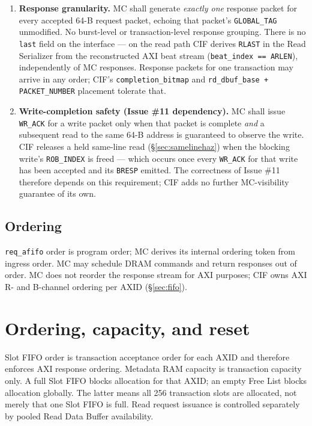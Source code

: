 \begin{enumerate}
  \item \textbf{Response granularity.}  MC shall generate \emph{exactly one}
        response packet for every accepted 64-B request packet, echoing that
        packet's \texttt{GLOBAL\_TAG} unmodified.  No burst-level or
        transaction-level response grouping.  There is no \texttt{last} field
        on the interface --- on the read path CIF derives \texttt{RLAST} in
        the Read Serializer from the reconstructed AXI beat stream
        (\texttt{beat\_index == ARLEN}), independently of MC responses.
        Response packets for one transaction may arrive in any order; CIF's
        \texttt{completion\_bitmap} and
        \texttt{rd\_dbuf\_base + PACKET\_NUMBER} placement tolerate that.
  \item \textbf{Write-completion safety (Issue \#11 dependency).}  MC shall
        issue \texttt{WR\_ACK} for a write packet only when that packet is
        complete \emph{and} a subsequent read to the same 64-B address is
        guaranteed to observe the write.  CIF releases a held same-line read
        (\S\ref{sec:samelinehaz}) when the blocking write's
        \texttt{ROB\_INDEX} is freed --- which occurs once every
        \texttt{WR\_ACK} for that write has been accepted and its
        \texttt{BRESP} emitted.  The correctness of Issue \#11 therefore
        depends on this requirement; CIF adds no further MC-visibility
        guarantee of its own.
\end{enumerate}

\subsection{Ordering}

\texttt{req\_afifo} order is program order; MC derives its internal ordering
token from ingress order.  MC may schedule DRAM commands and return responses
out of order.  MC does not reorder the response stream for AXI purposes;
CIF owns AXI R- and B-channel ordering per AXID (\S\ref{sec:fifo}).

\section{Ordering, capacity, and reset}

Slot FIFO order is transaction acceptance order for each AXID and therefore
enforces AXI response ordering.  Metadata RAM capacity is transaction capacity
only.  A full Slot FIFO blocks allocation for that AXID; an empty Free List
blocks allocation globally.  The latter means all 256 transaction slots are
allocated, not merely that one Slot FIFO is full.  Read request issuance is
controlled separately by pooled Read Data Buffer availability.

